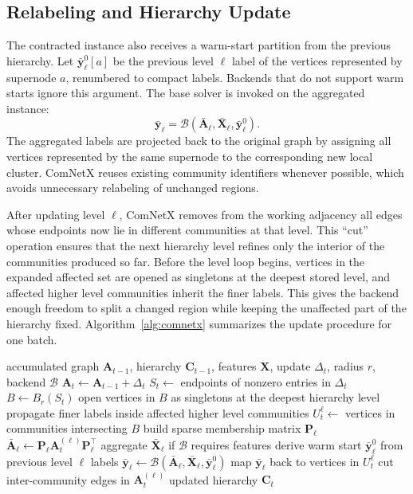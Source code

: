 \documentclass[conference]{IEEEtran}
\theoremstyle{definition}
\begin{document}
\subsection{Relabeling and Hierarchy Update}

The contracted instance also receives a warm-start partition from the previous
hierarchy. Let $\bar{\mathbf{y}}_\ell^0[a]$ be the previous level $\ell$ label
of the vertices represented by supernode $a$, renumbered to compact labels.
Backends that do not support warm starts ignore this argument. The base solver
is invoked on the aggregated instance:
\begin{equation*}
    \bar{\mathbf{y}}_\ell =
    \mathcal{B}(\bar{\mathbf{A}}_\ell,\bar{\mathbf{X}}_\ell,\bar{\mathbf{y}}_\ell^0).
\end{equation*}
The aggregated labels are projected back to the original graph by assigning all
vertices represented by the same supernode to the corresponding new local
cluster. ComNetX reuses existing community identifiers whenever
possible, which avoids unnecessary relabeling of unchanged regions.

After updating level $\ell$, ComNetX removes from the working adjacency all
edges whose endpoints now lie in different communities at that level. This
``cut'' operation ensures that the next hierarchy level refines only the
interior of the communities produced so far. Before the level loop begins,
vertices in the expanded affected set are opened as singletons at the deepest
stored level, and affected higher level communities inherit the finer labels.
This gives the backend enough freedom to split a changed region while keeping
the unaffected part of the hierarchy fixed. Algorithm~\ref{alg:comnetx}
summarizes the update procedure for one batch.

\begin{algorithm}[t]
\caption{ComNetX update for one batch}
\label{alg:comnetx}
\begin{algorithmic}[1]
\Require accumulated graph $\mathbf{A}_{t-1}$, hierarchy $\mathbf{C}_{t-1}$,
features $\mathbf{X}$, update $\Delta_t$, radius $r$, backend $\mathcal{B}$
\State $\mathbf{A}_t \gets \mathbf{A}_{t-1}+\Delta_t$
\State $S_t \gets$ endpoints of nonzero entries in $\Delta_t$
\State $B \gets B_r(S_t)$
\State open vertices in $B$ as singletons at the deepest hierarchy level
\State propagate finer labels inside affected higher level communities
    \State $U^\ell_t \gets$ vertices in communities intersecting $B$
    \State build sparse membership matrix $\mathbf{P}_\ell$
    \State $\bar{\mathbf{A}}_\ell \gets
        \mathbf{P}_\ell \mathbf{A}^{(\ell)}_t \mathbf{P}_\ell^\top$
    \State aggregate $\bar{\mathbf{X}}_\ell$ if $\mathcal{B}$ requires features
    \State derive warm start $\bar{\mathbf{y}}_\ell^0$ from previous level $\ell$ labels
    \State $\bar{\mathbf{y}}_\ell \gets
        \mathcal{B}(\bar{\mathbf{A}}_\ell,\bar{\mathbf{X}}_\ell,\bar{\mathbf{y}}_\ell^0)$
    \State map $\bar{\mathbf{y}}_\ell$ back to vertices in $U^\ell_t$
    \State cut inter-community edges in $\mathbf{A}^{(\ell)}_t$
\EndFor
\State \Return updated hierarchy $\mathbf{C}_t$
\end{algorithmic}
\end{algorithm}
\end{document}
